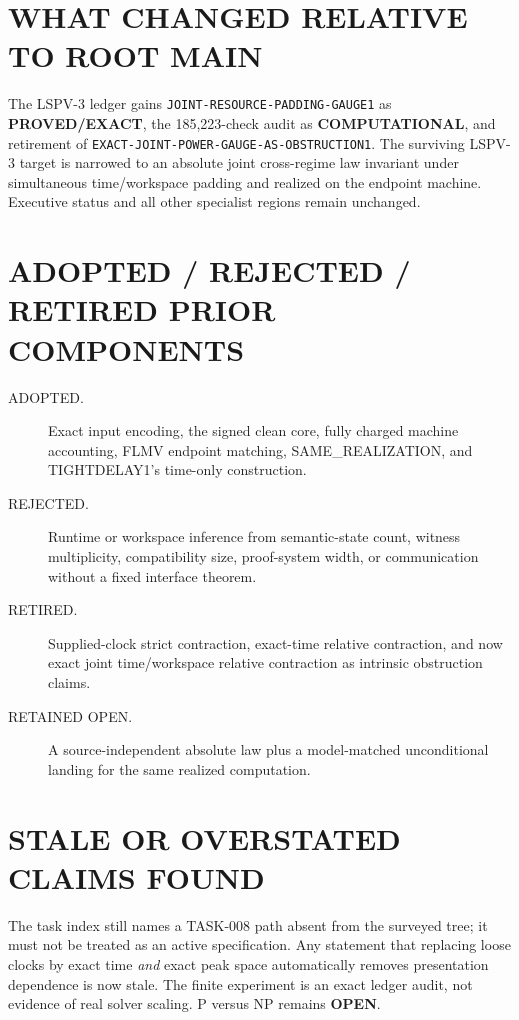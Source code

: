 \documentclass[11pt]{article}
\newcommand{\OPEN}{\textbf{OPEN}}
\newcommand{\EXACT}{\textbf{PROVED/EXACT}}
\newcommand{\COMP}{\textbf{COMPUTATIONAL}}
\begin{document}
\section{WHAT CHANGED RELATIVE TO ROOT MAIN}

The LSPV-3 ledger gains \texttt{JOINT-RESOURCE-PADDING-GAUGE1} as \EXACT,
the 185,223-check audit as \COMP, and retirement of
\texttt{EXACT-JOINT-POWER-GAUGE-AS-OBSTRUCTION1}.  The surviving LSPV-3 target
is narrowed to an absolute joint cross-regime law invariant under simultaneous
time/workspace padding and realized on the endpoint machine.  Executive status
and all other specialist regions remain unchanged.

\section{ADOPTED / REJECTED / RETIRED PRIOR COMPONENTS}

\begin{description}
\item[ADOPTED.] Exact input encoding, the signed clean core, fully charged
machine accounting, FLMV endpoint matching, SAME\_REALIZATION, and
TIGHTDELAY1's time-only construction.
\item[REJECTED.] Runtime or workspace inference from semantic-state count,
witness multiplicity, compatibility size, proof-system width, or communication
without a fixed interface theorem.
\item[RETIRED.] Supplied-clock strict contraction, exact-time relative
contraction, and now exact joint time/workspace relative contraction as
intrinsic obstruction claims.
\item[RETAINED OPEN.] A source-independent absolute law plus a model-matched
unconditional landing for the same realized computation.
\end{description}

\section{STALE OR OVERSTATED CLAIMS FOUND}

The task index still names a TASK-008 path absent from the surveyed tree; it
must not be treated as an active specification.  Any statement that replacing
loose clocks by exact time \emph{and} exact peak space automatically removes
presentation dependence is now stale.  The finite experiment is an exact
ledger audit, not evidence of real solver scaling.  P versus NP remains
\OPEN.
\end{document}
